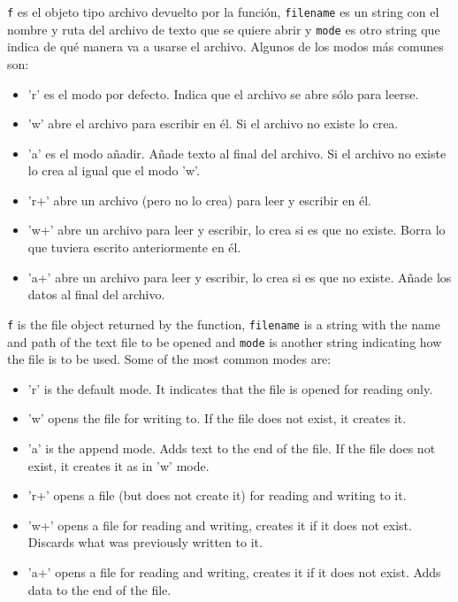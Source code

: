 \begin{paracol}{2}
    \texttt{f} es el objeto tipo archivo devuelto por la función, \texttt{filename} es un string con el nombre y ruta del archivo de texto que se quiere abrir y \texttt{mode} es otro string que indica de qué manera va a usarse el archivo. Algunos de los modos más comunes son:
    \begin{itemize}
        \item 'r' es el modo por defecto. Indica que el archivo se abre sólo para leerse.
        \item 'w' abre el archivo para escribir en él. Si el archivo no existe lo crea.
        \item 'a' es el modo añadir. Añade texto al final del archivo. Si el archivo no existe lo crea al igual que el modo 'w'.
        \item 'r+' abre un archivo (pero no lo crea) para leer y escribir en él.
        \item 'w+' abre un archivo para leer y escribir, lo crea si es que no existe. Borra lo que tuviera escrito anteriormente en él.
        \item 'a+'  abre un archivo para leer y escribir, lo crea si es que no existe. Añade los datos al final del archivo.
    \end{itemize}
    \switchcolumn
    \texttt{f} is the file object returned by the function, \texttt{filename} is a string with the name and path of the text file to be opened and \texttt{mode} is another string indicating how the file is to be used. Some of the most common modes are:
    \begin{itemize}
        \item 'r' is the default mode. It indicates that the file is opened for reading only.
        \item 'w' opens the file for writing to. If the file does not exist, it creates it.
        \item 'a' is the append mode. Adds text to the end of the file. If the file does not exist, it creates it as in 'w' mode.
        \item 'r+' opens a file (but does not create it) for reading and writing to it.
        \item 'w+' opens a file for reading and writing, creates it if it does not exist. Discards what was previously written to it.
        \item 'a+' opens a file for reading and writing, creates it if it does not exist. Adds data to the end of the file.
    \end{itemize}


\end{paracol}
